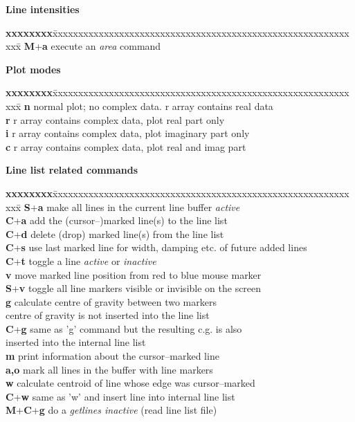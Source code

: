 \documentclass[10pt]{article}
\def\key#1#2{\textbf{#1}+\textbf{#2}}
\def\kkey#1#2#3{\textbf{#1}+\textbf{#2}+\textbf{#3}}
\begin{document}
{\noindent
{\bf Line intensities}
\begin{tabbing}
\textbf{xxxxxxxx}\=
xxxxxxxxxxxxxxxxxxxxxxxxxxxxxxxxxxxxxxxxxxxxxxxxxxxxxxxxxxxxx\= \kill
\key{M}{a}	\>	  execute an {\em area} command\\
\end{tabbing}

\noindent	
{\bf Plot modes}
\begin{tabbing}
\textbf{xxxxxxxx}\=
xxxxxxxxxxxxxxxxxxxxxxxxxxxxxxxxxxxxxxxxxxxxxxxxxxxxxxxxxxxxx\= \kill
\textbf{n}	\>	  normal plot; no complex data. r array contains real data\\
\textbf{r}	\>	  r array contains complex data, plot real part only\\
\textbf{i}	\>	  r array contains complex data, plot imaginary part only\\
\textbf{c}	\>	  r array contains complex data, plot real and imag part\\
\end{tabbing}

\newpage

\noindent	
{\bf Line list related commands}
\begin{tabbing}
\textbf{xxxxxxxx}\=
xxxxxxxxxxxxxxxxxxxxxxxxxxxxxxxxxxxxxxxxxxxxxxxxxxxxxxxxxxxxx\= \kill
\key{S}{a}	\>   make all lines in the current line buffer {\em active}\\
\key{C}{a}	\>   add the (cursor--)marked line(s) to the line list\\
\key{C}{d}	\>   delete (drop) marked line(s) from the line list\\
\key{C}{s}	\>   use last marked line for width, damping etc. of future added lines\\
\key{C}{t}	\>   toggle a line {\em active} or {\em inactive}\\
\textbf{v}      \>   move marked line position from red to blue mouse marker\\
\key{S}{v}	\>   toggle all line markers visible or invisible on the screen\\
\textbf{g}	\>   calculate centre of gravity between two markers\\
		\>   centre of gravity is not inserted into the line list\\
\key{C}{g}	\>   same as 'g' command but the resulting c.g. is also\\
		\>   inserted into the internal line list\\
\textbf{m}	\>   print information about the cursor--marked line\\
\textbf{a,o}	\>   mark all lines in the buffer with line markers\\
\textbf{w}	\>   calculate centroid of line whose edge was cursor--marked\\
\key{C}{w}	\>   same as 'w' and insert line into internal line list\\
\kkey{M}{C}{g}  \>   do a {\em getlines inactive} (read line list file)\\
\end{tabbing}

}
\end{document}
